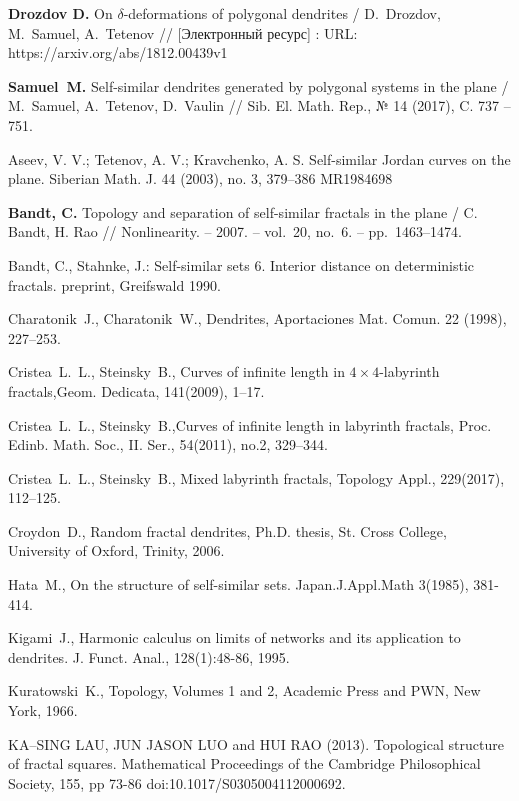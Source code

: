 \begin{thebibliography}{99}
{\bf Drozdov D.}
On $\delta$-deformations of polygonal dendrites /
D.~Drozdov, M.~Samuel, A.~Tetenov //
[Электронный ресурс] : URL: https://arxiv.org/abs/1812.00439v1

{\bf Samuel~M.}
 Self-similar dendrites generated by polygonal systems in the plane /
 M.~Samuel, A.~Tetenov, D.~Vaulin // 
Sib. El. Math. Rep., № 14 (2017), C. 737 -- 751. 


 Aseev, V. V.; Tetenov, A. V.; Kravchenko, A. S. Self-similar Jordan curves on
the plane.  Siberian Math. J. 44 (2003), no. 3, 379--386 MR1984698

  {\bf Bandt, C.} Topology and separation of self-similar fractals in the plane / C. Bandt, H. Rao // Nonlinearity. -- 2007. -- vol.~20, no.~6. -- pp.~1463--1474.

 Bandt, C., Stahnke, J.: Self-similar sets 6. Interior distance on deterministic fractals.
preprint, Greifswald 1990.

  Charatonik~J., Charatonik~W., Dendrites, Aportaciones Mat. Comun.
22 (1998), 227--253.

 {Cristea~L.~L.}, {Steinsky~B.}, Curves of infinite length in $4 \times 4$-labyrinth fractals,{Geom. Dedicata}, 141(2009), 1--17.

 {Cristea~L.~L.}, {Steinsky~B.},Curves of infinite length in labyrinth fractals, {Proc. Edinb. Math. Soc., II. Ser.}, 54(2011), no.2, 329--344.


  {Cristea~L.~L.}, {Steinsky~B.}, Mixed labyrinth fractals, {Topology Appl.}, 229(2017), 112--125.

 Croydon~D., Random fractal dendrites, Ph.D. thesis, St. Cross College, University of Oxford, Trinity, 2006.

Hata~M., On the structure of self-similar sets. Japan.J.Appl.Math 3(1985), 381-414.

 Kigami~J., Harmonic calculus on limits of networks and its application to dendrites. J. Funct. Anal., 128(1):48-86, 1995.


Kuratowski~K.,  Topology, Volumes 1 and 2, Academic Press and PWN,
New York, 1966.

 KA–SING LAU, JUN JASON LUO and HUI RAO (2013). Topological structure of fractal squares.
Mathematical Proceedings of the Cambridge Philosophical Society, 155, pp 73-86 doi:10.1017/S0305004112000692.


\end{thebibliography}
